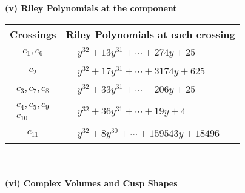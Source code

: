 \documentclass[1p]{elsarticle_modified}
\theoremstyle{definition}
\begin{document}
\newpage\renewcommand{\arraystretch}{1}
\flushleft \textbf{(v) Riley Polynomials at the component}\newline \\
\begin{tabular}{m{50pt}|m{274pt}}
Crossings & \hspace{64pt}Riley Polynomials at each crossing \\
\hline $$\begin{aligned}c_{1},c_{6}\end{aligned}$$&$\begin{aligned}
&y^{32}+13 y^{31}+\cdots+274 y+25
\end{aligned}$\\
\hline $$\begin{aligned}c_{2}\end{aligned}$$&$\begin{aligned}
&y^{32}+17 y^{31}+\cdots+3174 y+625
\end{aligned}$\\
\hline $$\begin{aligned}c_{3},c_{7},c_{8}\end{aligned}$$&$\begin{aligned}
&y^{32}+33 y^{31}+\cdots-206 y+25
\end{aligned}$\\
\hline $$\begin{aligned}c_{4},c_{5},c_{9}\\c_{10}\end{aligned}$$&$\begin{aligned}
&y^{32}+36 y^{31}+\cdots+19 y+4
\end{aligned}$\\
\hline $$\begin{aligned}c_{11}\end{aligned}$$&$\begin{aligned}
&y^{32}+8 y^{30}+\cdots+159543 y+18496
\end{aligned}$\\
\hline
\end{tabular}\\~\\
\newpage\flushleft \textbf{(vi) Complex Volumes and Cusp Shapes}
\end{document}
